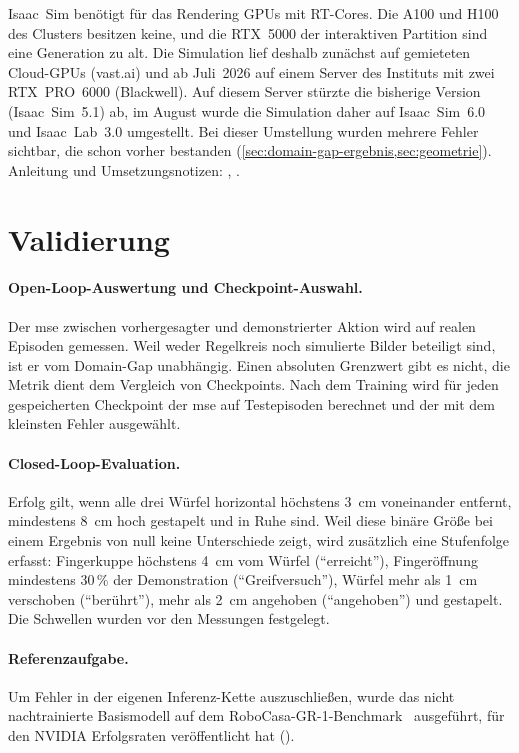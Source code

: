 Isaac~Sim benötigt für das Rendering GPUs mit RT-Cores. Die A100 und H100 des
Clusters besitzen keine, und die RTX~5000 der interaktiven Partition sind eine
Generation zu alt. Die Simulation lief deshalb zunächst auf gemieteten
Cloud-GPUs (vast.ai) und ab Juli~2026 auf einem Server des Instituts mit zwei
RTX~PRO~6000 (Blackwell). Auf diesem Server stürzte die bisherige Version (Isaac~Sim~5.1) ab, im
August wurde die Simulation daher auf Isaac~Sim~6.0 und Isaac~Lab~3.0
umgestellt. Bei dieser Umstellung wurden mehrere Fehler sichtbar, die schon
vorher bestanden (\cref{sec:domain-gap-ergebnis,sec:geometrie}).
Anleitung und Umsetzungsnotizen: ,
.

\section{Validierung}
\label{sec:validierung}
\label{sec:eval-methodik}

\paragraph{Open-Loop-Auswertung und Checkpoint-Auswahl.}
Der \ac{mse} zwischen vorhergesagter und demonstrierter Aktion wird auf realen
Episoden gemessen. Weil weder Regelkreis noch simulierte Bilder beteiligt
sind, ist er vom Domain-Gap unabhängig. Einen absoluten Grenzwert gibt es
nicht, die Metrik dient dem Vergleich von Checkpoints. Nach dem Training wird
für jeden gespeicherten Checkpoint der \ac{mse} auf Testepisoden berechnet und
der mit dem kleinsten Fehler ausgewählt.

\paragraph{Closed-Loop-Evaluation.}
Erfolg gilt, wenn alle drei Würfel horizontal höchstens 3~cm voneinander
entfernt, mindestens 8~cm hoch gestapelt und in Ruhe sind. Weil diese binäre
Größe bei einem Ergebnis von null keine Unterschiede zeigt, wird zusätzlich
eine Stufenfolge erfasst: Fingerkuppe höchstens 4~cm vom Würfel
(\enquote{erreicht}), Fingeröffnung mindestens 30\,\% der Demonstration
(\enquote{Greifversuch}), Würfel mehr als 1~cm verschoben
(\enquote{berührt}), mehr als 2~cm angehoben (\enquote{angehoben}) und
gestapelt. Die Schwellen wurden vor den Messungen festgelegt.

\paragraph{Referenzaufgabe.}
Um Fehler in der eigenen Inferenz-Kette auszuschließen, wurde das nicht
nachtrainierte Basismodell auf dem RoboCasa-GR-1-Benchmark~\cite{robocasa2024}
ausgeführt, für den NVIDIA Erfolgsraten veröffentlicht hat
().

